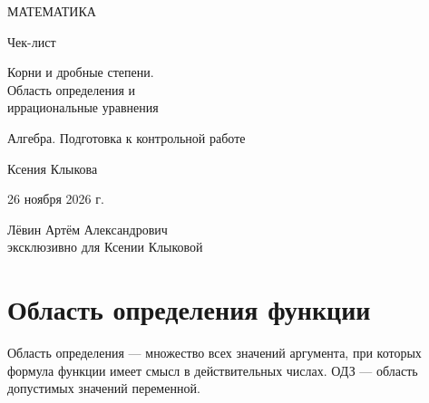 \documentclass[a4paper,12pt]{article}
\begin{document}
\begin{titlepage}
\centering
\vspace*{27mm}
{\Large\color{darkaccent} МАТЕМАТИКА\par}
\vspace{15mm}
{\Huge Чек-лист\par}
\vspace{10mm}
{\LARGE\color{accent} Корни и дробные степени.\\ Область определения и\\ иррациональные уравнения\par}
\vspace{14mm}
{\large Алгебра. Подготовка к контрольной работе\par}
\vfill
{\large Ксения Клыкова\par}
\vspace{9mm}
{\large 26 ноября 2026 г.\par}
\vspace{16mm}
{Лёвин Артём Александрович\\эксклюзивно для Ксении Клыковой\par}
\vspace{20mm}
\vspace{7mm}
\end{titlepage}
\section{Область определения функции}
Область определения --- множество всех значений аргумента, при которых формула функции имеет смысл в действительных числах. ОДЗ --- область допустимых значений переменной.
\end{document}
